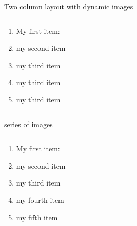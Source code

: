 \documentclass{beamer}
\begin{document}
\begin{frame}{Two column layout with dynamic images}
\begin{columns}
        \begin{column}{0.5\textwidth}
          \begin{enumerate}
              \item<1-> My first item: 
              \item<2-> my second item
              \item<3-> my third item
              \item<4-> my third item
              \item<5-> my third item
          \end{enumerate}
        \end{column}
        \begin{column}{0.5\textwidth}
        \end{column}
\end{columns}
\end{frame}
\begin{frame}{series of images}
    \begin{columns}
        \begin{column}{0.5\textwidth}
            \begin{enumerate}
                      \item<1-> My first item: 
                      \item<2-> my second item
                      \item<3-> my third item
                      \item<4-> my fourth item
                      \item<5-> my fifth item
            \end{enumerate}
        \end{column}
        \begin{column}{0.5\textwidth}
        \end{column}
    \end{columns}
\end{frame}
\end{document}
